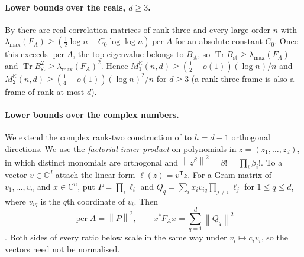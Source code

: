 \documentclass[11pt,a4paper]{article}
\theoremstyle{remark}
\newcommand{\per}{\operatorname{per}}
\newcommand{\Tr}{\operatorname{Tr}}
\newcommand{\norm}[1]{\left\lVert#1\right\rVert}
\newcommand{\R}{\mathbb R}
\newcommand{\C}{\mathbb C}
\newcommand{\std}{\mathrm{st}}
\begin{document}
\paragraph{Lower bounds over the reals, $d\ge3$.} By \cite[Theorem~1.1]{EPBS} there are real correlation matrices of rank three and every large order $n$ with $\lambda_{\max}(F_A)\ge(\frac12\log n-C_0\log\log n)\per A$ for an absolute constant $C_0$. Once this exceeds $\per A$, the top eigenvalue belongs to $B_\std$, so $\Tr B_\std\ge\lambda_{\max}(F_A)$ and $\Tr B_\std^2\ge\lambda_{\max}(F_A)^2$. Hence $M_1^\R(n,d)\ge(\frac12-o(1))(\log n)/n$ and $M_2^\R(n,d)\ge(\frac14-o(1))(\log n)^2/n$ for $d\ge3$ (a rank-three frame is also a frame of rank at most $d$).

\paragraph{Lower bounds over the complex numbers.} We extend the complex rank-two construction of \cite{EPBS} to $h=d-1$ orthogonal directions. We use the \emph{factorial inner product} on polynomials in $z=(z_1,\dots,z_d)$, in which distinct monomials are orthogonal and $\norm{z^\beta}^2=\beta!=\prod_i\beta_i!$. To a vector $v\in\C^d$ attach the linear form $\ell(z)=v^{\mathsf T}z$. For a Gram matrix of $v_1,\dots,v_n$ and $x\in\C^n$, put $P=\prod_i\ell_i$ and $Q_q=\sum_ix_iv_{iq}\prod_{j\ne i}\ell_j$ for $1\le q\le d$, where $v_{iq}$ is the $q$th coordinate of $v_i$. Then
\begin{equation}\label{eq:fock}
 \per A=\norm P^2,\qquad x^*F_Ax=\sum_{q=1}^d\norm{Q_q}^2
\end{equation}
\cite[Lemma~3.1]{EPBS}. Both sides of every ratio below scale in the same way under $v_i\mapsto c_iv_i$, so the vectors need not be normalised.
\end{document}
